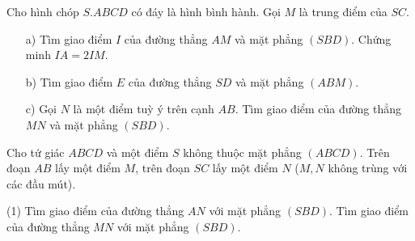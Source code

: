 \begin{vd}
	Cho hình chóp $S.ABCD$ có đáy là hình bình hành. Gọi $M$ là trung điểm của $SC$.
	\begin{itemize}
		\item [a)] Tìm giao điểm $I$ của đường thẳng $AM$ và mặt phẳng $\left(SBD\right)$. Chứng minh $IA=2IM$.
		\item [b)] Tìm giao điểm $E$ của đường thẳng $SD$ và mặt phẳng $\left(ABM\right)$.
		\item [c)] Gọi $N$ là một điểm tuỳ ý trên cạnh $AB$. Tìm giao điểm của đường thẳng $MN$ và mặt phẳng $\left(SBD\right)$.
	\end{itemize}
\end{vd}


\begin{vd}
	Cho tứ giác $ABCD$ và một điểm $S$ không thuộc mặt phẳng $(ABCD)$. Trên đoạn $AB$ lấy một điểm $M$, trên đoạn $SC$ lấy một điểm $N$ ($M,N$ không trùng với các đầu mút).
	\begin{tasks}(1)
		\task Tìm giao điểm của đường thẳng $AN$ với mặt phẳng $(SBD)$.
		\task Tìm giao điểm của đường thẳng $MN$ với mặt phẳng $(SBD)$.
	\end{tasks}
\end{vd}
